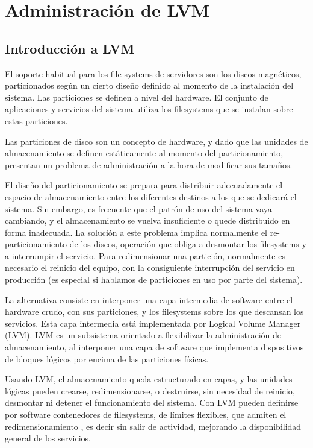 
\section{Administración de LVM}
\subsection{Introducción a  LVM}
\label{sub:introLVM}
El soporte habitual para los file systems de servidores son los discos magnéticos, particionados según un cierto diseño definido al momento de la instalación del sistema. Las particiones se definen a nivel del hardware. El conjunto de aplicaciones y servicios del sistema utiliza los filesystems que se instalan sobre estas particiones. 

Las particiones de disco son un concepto de hardware, y dado que las unidades de almacenamiento se definen estáticamente al momento del particionamiento, presentan un problema de administración a la hora de modificar sus tamaños. 


El diseño del particionamiento se prepara para distribuir adecuadamente el espacio de almacenamiento entre los diferentes destinos a los que se dedicará el sistema. Sin embargo, es frecuente que el patrón de uso del sistema vaya cambiando, y el almacenamiento se vuelva insuficiente o quede distribuido en forma inadecuada. La solución a este problema implica normalmente el re-particionamiento de los discos, operación que obliga a desmontar los filesystems y a interrumpir el servicio. Para redimensionar una partición, normalmente es necesario el reinicio del equipo, con la consiguiente interrupción del servicio en producción (es especial si hablamos de particiones en uso por parte del sistema). 


La alternativa consiste en interponer una capa intermedia de software entre el hardware crudo, con sus particiones, y los filesystems sobre los que descansan los servicios. Esta capa intermedia está implementada por Logical Volume Manager (LVM). LVM es un subsistema orientado a flexibilizar la administración de almacenamiento, al interponer una capa de software que implementa dispositivos de bloques lógicos por encima de las particiones físicas. 

Usando LVM, el almacenamiento queda estructurado en capas, y las unidades lógicas pueden crearse, redimensionarse, o destruirse, sin necesidad de reinicio, desmontar ni detener el funcionamiento del sistema. Con LVM pueden definirse por software contenedores de filesystems, de límites flexibles, que admiten el redimensionamiento , es decir sin salir de actividad, mejorando la disponibilidad general de los servicios.

